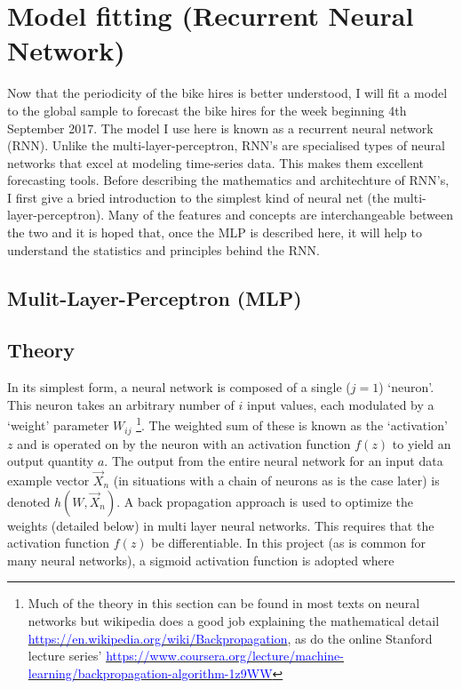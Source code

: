 \documentclass[10pt]{article}
\begin{document}
\section{Model fitting (Recurrent Neural Network)}
\label{sec_recur}


Now that the periodicity of the bike hires is better understood, I will fit a model to the global sample to forecast the bike hires for the week beginning 4th September 2017. The model I use here is known as a recurrent neural network (RNN). Unlike the multi-layer-perceptron, RNN's are specialised types of neural networks that excel at modeling time-series data. This makes them excellent forecasting tools. Before describing the mathematics and architechture of RNN's, I first give a bried introduction to the simplest kind of neural net (the multi-layer-perceptron). Many of the features and concepts are interchangeable between the two and it is hoped that, once the MLP is described here, it will help to understand the statistics and principles behind the RNN.



\subsection{Mulit-Layer-Perceptron (MLP)}

\subsection{Theory} 


In its simplest form, a neural network is composed of a single ($j=1$) `neuron'. This neuron takes an arbitrary number of $i$ input values, each modulated by a `weight' parameter $W_{ij}$ \footnote{Much of the theory in this section can be found in most texts on neural networks but wikipedia does a good job explaining the mathematical detail \href{ https://en.wikipedia.org/wiki/Backpropagation}{\textcolor{blue}{https://en.wikipedia.org/wiki/Backpropagation}}, as do the online Stanford lecture series' \href{ https://www.coursera.org/lecture/machine-learning/backpropagation-algorithm-1z9WW}{\textcolor{blue}{https://www.coursera.org/lecture/machine-learning/backpropagation-algorithm-1z9WW}}}. The weighted sum of these is known as the `activation' $z$ and is operated on by the neuron with an activation function $f (z)$ to yield an output quantity $a$. The output from the entire neural network for an input data example vector $\vec{X}_n$ (in situations with a chain of neurons as is the case later) is denoted $h(W,\vec{X}_n)$. A back propagation approach is used to optimize the weights (detailed below) in multi layer neural networks. This requires that the activation function $f(z)$ be differentiable. In this project (as is common for many neural networks), a sigmoid activation function is adopted where 
\end{document}
